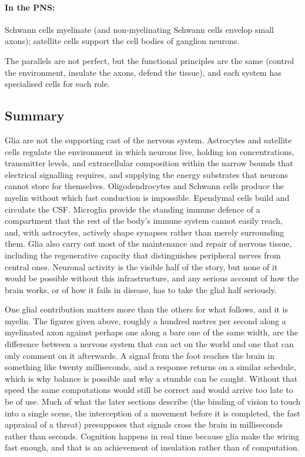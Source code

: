 \documentclass[11pt]{article}
\begin{document}
\paragraph{In the PNS:} Schwann cells myelinate (and non-myelinating Schwann cells envelop small axons); satellite cells support the cell bodies of ganglion neurons.

The parallels are not perfect, but the functional principles are the same (control the environment, insulate the axons, defend the tissue), and each system has specialised cells for each role.

\subsection{Summary}

Glia are not the supporting cast of the nervous system. Astrocytes and satellite cells regulate the environment in which neurons live, holding ion concentrations, transmitter levels, and extracellular composition within the narrow bounds that electrical signalling requires, and supplying the energy substrates that neurons cannot store for themselves. Oligodendrocytes and Schwann cells produce the myelin without which fast conduction is impossible. Ependymal cells build and circulate the CSF. Microglia provide the standing immune defence of a compartment that the rest of the body's immune system cannot easily reach, and, with astrocytes, actively shape synapses rather than merely surrounding them. Glia also carry out most of the maintenance and repair of nervous tissue, including the regenerative capacity that distinguishes peripheral nerves from central ones. Neuronal activity is the visible half of the story, but none of it would be possible without this infrastructure, and any serious account of how the brain works, or of how it fails in disease, has to take the glial half seriously.

One glial contribution matters more than the others for what follows, and it is myelin. The figures given above, roughly a hundred metres per second along a myelinated axon against perhaps one along a bare one of the same width, are the difference between a nervous system that can act on the world and one that can only comment on it afterwards. A signal from the foot reaches the brain in something like twenty milliseconds, and a response returns on a similar schedule, which is why balance is possible and why a stumble can be caught. Without that speed the same computations would still be correct and would arrive too late to be of use. Much of what the later sections describe (the binding of vision to touch into a single scene, the interception of a movement before it is completed, the fast appraisal of a threat) presupposes that signals cross the brain in milliseconds rather than seconds. Cognition happens in real time because glia make the wiring fast enough, and that is an achievement of insulation rather than of computation.
\end{document}
